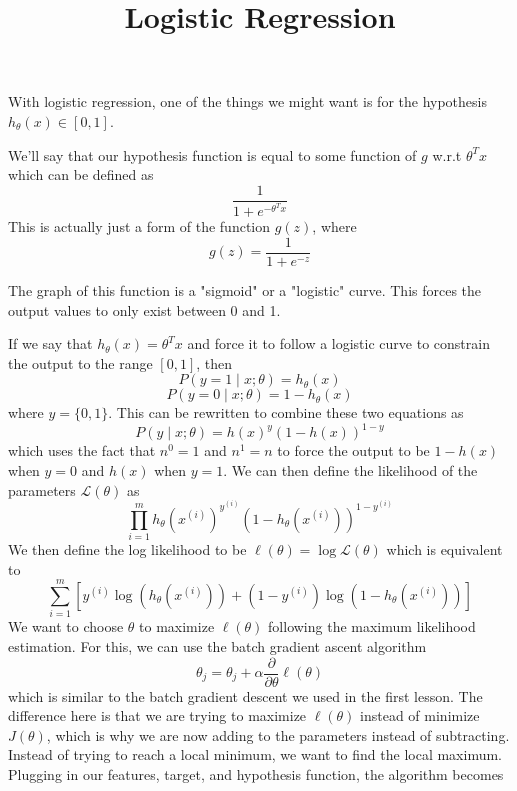 \documentclass[11pt]{article}
\title{Logistic Regression}
\author{}
\date{}
\begin{document}
\maketitle
\vspace{-1.2em}
With logistic regression, one of the things we might want
is for the hypothesis $h_\theta(x) \in [0, 1]$.

We'll say that our hypothesis function is equal to
some function of $g$ w.r.t $\theta^{T}x$ which can be defined as
$$\frac{1}{1 + e^{-\theta^{T}x}}$$
This is actually just a form
of the function $g(z)$, where $$g(z) = \frac{1}{1 + e^{-z}}$$

The graph of this function is a "sigmoid" or a "logistic" curve.
This forces the output values to only exist between 0 and 1.
\begin{center}
\end{center}
If we say that $h_\theta(x) = \theta^T x$ and force it to follow a logistic curve to constrain the output to the range $[0, 1]$, then $$P(y=1 \mid x;\theta) = h_\theta(x)$$ $$P(y=0 \mid x;\theta) = 1 - h_\theta(x)$$ where $y = \{0, 1\}$. This can be rewritten to combine these two equations as $$P(y \mid x;\theta) = h(x)^y (1 - h(x))^{1-y}$$ which uses the fact that $n^0 = 1$ and $n^1 = n$ to force the output to be $1 - h(x)$ when $y = 0$ and $h(x)$ when $y = 1$.
We can then define the likelihood of the parameters $\mathcal{L}(\theta)$ as
$$\prod_{i=1}^{m} h_\theta \left(x^{(i)}\right)^{y^{(i)}}\left(1-h_\theta \left(x^{(i)}\right)\right)^{1-y^{(i)}}$$
We then define the log likelihood to be $\ell(\theta) = \log{\mathcal{L}(\theta)}$ which is equivalent to
$$\sum_{i=1}^{m}\left[y^{(i)}\log{\left(h_\theta\left(x^{(i)}\right)\right)} + \left(1-y^{(i)}\right)\log{\left(1-h_\theta\left(x^{(i)}\right)\right)}\right]$$
We want to choose $\theta$ to maximize $\ell(\theta)$ following the maximum likelihood estimation. For this, we can use the batch gradient ascent algorithm
$$\theta_j = \theta_j + \alpha \frac{\partial}{\partial\theta}\ell(\theta)$$ which is similar to the batch gradient descent we used in the first lesson. The difference here is that we are trying to maximize $\ell(\theta)$ instead of minimize $J(\theta)$, which is why we are now adding to the parameters instead of subtracting. Instead of trying to reach a local minimum, we want to find the local maximum. Plugging in our features, target, and hypothesis function, the algorithm becomes
\end{document}
